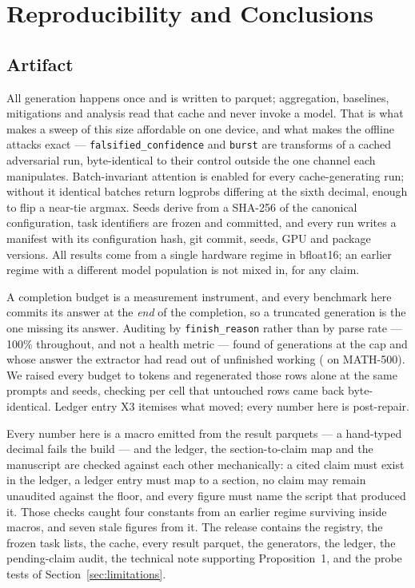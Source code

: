 \section{Reproducibility and Conclusions}
\label{sec:reproducibility}

\subsection{Artifact}

All generation happens once and is written to parquet; aggregation, baselines,
mitigations and analysis read that cache and never invoke a model. That is what
makes a sweep of this size affordable on one device, and what makes the offline
attacks exact --- \texttt{falsified\_confidence} and \texttt{burst} are transforms
of a cached adversarial run, byte-identical to their control outside the one
channel each manipulates. Batch-invariant attention is enabled for every
cache-generating run; without it identical batches return logprobs differing at
the sixth decimal, enough to flip a near-tie argmax. Seeds derive from a SHA-256
of the canonical configuration, task identifiers are frozen and committed, and
every run writes a manifest with its configuration hash, git commit, seeds, GPU
and package versions. All results come from a single hardware regime in bfloat16;
an earlier regime with a different model population is not mixed in, for any
claim.

A completion budget is a measurement instrument, and every benchmark here commits
its answer at the \emph{end} of the completion, so a truncated generation is the
one missing its answer. Auditing by \texttt{finish\_reason} rather than by parse
rate --- 100\% throughout, and not a health metric --- found
\numTruncPinnedBefore{} of \numCacheRows{} generations at the cap and
\numManufacturedBefore{} whose answer the extractor had read out of unfinished
working (\numManufacturedMathfive{} on MATH-500). We raised every budget to
\numBudgetTokens{} tokens and regenerated those rows alone at the same prompts
and seeds, checking per cell that untouched rows came back byte-identical.
Ledger entry X3 itemises what moved; every number here is post-repair.

Every number here is a macro emitted from the result parquets --- a hand-typed
decimal fails the build --- and the ledger, the section-to-claim map and the
manuscript are checked against each other mechanically: a cited claim must exist
in the ledger, a ledger entry must map to a section, no claim may remain
unaudited against the floor, and every figure must name the script that produced
it. Those checks caught four constants from an earlier regime surviving inside
macros, and seven stale figures from it. The release contains the registry, the
frozen task lists, the cache, every result parquet, the generators, the ledger,
the pending-claim audit, the technical note supporting Proposition~1, and the
probe tests of Section~\ref{sec:limitations}. 

